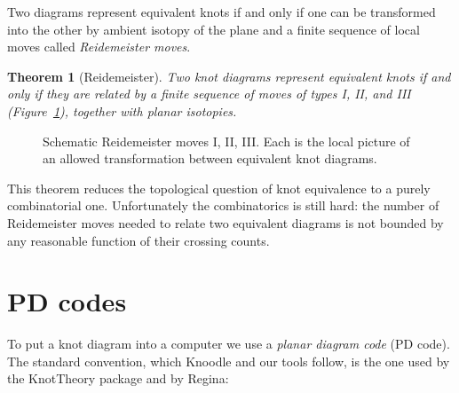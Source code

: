 \documentclass[11pt,oneside]{report}
\newtheorem{theorem}{Theorem}[chapter]
\theoremstyle{definition}
\begin{document}
Two diagrams represent equivalent knots if and only if one can be transformed
into the other by ambient isotopy of the plane and a finite sequence of
local moves called \emph{Reidemeister moves}.

\begin{theorem}[Reidemeister]
Two knot diagrams represent equivalent knots if and only if they are related
by a finite sequence of moves of types I, II, and III (Figure~\ref{fig:reide}),
together with planar isotopies.
\end{theorem}

\begin{figure}[h]
\centering
{}
\caption{Schematic Reidemeister moves I, II, III. Each is the local picture of
an allowed transformation between equivalent knot diagrams.}
\label{fig:reide}
\end{figure}

This theorem reduces the topological question of knot equivalence to a purely
combinatorial one. Unfortunately the combinatorics is still hard: the number
of Reidemeister moves needed to relate two equivalent diagrams is not bounded
by any reasonable function of their crossing counts.

\section{PD codes}

To put a knot diagram into a computer we use a \emph{planar diagram code} (PD
code). The standard convention, which Knoodle and our tools follow, is the
one used by the KnotTheory package and by Regina:
\end{document}
